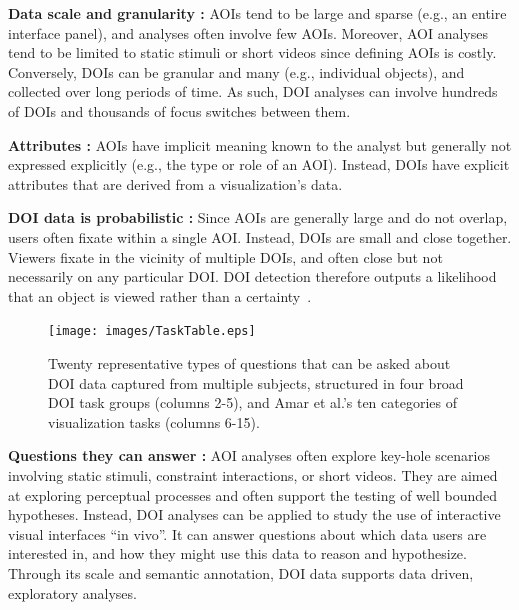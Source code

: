 \noindent \textbf{Data scale and granularity :} AOIs tend to be large and sparse (e.g., an entire interface panel), and analyses often involve few AOIs. Moreover, AOI analyses tend to be limited to static stimuli or short videos since defining AOIs is costly. Conversely, DOIs can be granular and many (e.g., individual objects), and collected over long periods of time. As such, DOI analyses can involve hundreds of DOIs and thousands of focus switches between them. 

\noindent \textbf{Attributes :} AOIs have implicit meaning known to the analyst but generally not expressed explicitly (e.g., the type or role of an AOI). Instead, DOIs have explicit attributes that are derived from a visualization's data. 

\noindent \textbf{DOI data is probabilistic :} Since AOIs are generally large and do not overlap, users often fixate within a single AOI. Instead, DOIs are small and close together. Viewers fixate in the vicinity of multiple DOIs, and often close but not necessarily on any particular DOI. DOI detection therefore outputs a likelihood that an object is viewed rather than a certainty~\cite{alam15analyzing}.

\begin{figure}[htbp]
  \centering
	\texttt{[image: images/TaskTable.eps]}
  \caption{Twenty representative types of questions that can be asked about DOI data captured from multiple subjects, structured in four broad DOI task groups (columns 2-5), and Amar et al.'s ten categories of visualization tasks (columns 6-15). }
	\label{fig:taxonomy}
\end{figure}

\noindent \textbf{Questions they can answer :} AOI analyses often explore key-hole scenarios involving static stimuli, constraint interactions, or short videos. They are aimed at exploring perceptual processes and often support the testing of well bounded hypotheses. Instead, DOI analyses can be applied to study the use of interactive visual interfaces ``in vivo''. It can answer questions about which data users are interested in, and how they might use this data to reason and hypothesize. Through its scale and semantic annotation, DOI data supports data driven, exploratory analyses. 
 










